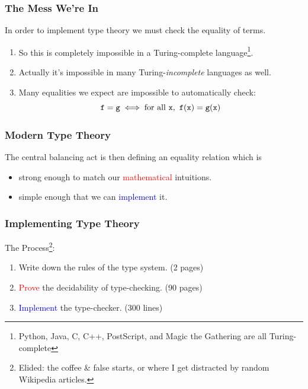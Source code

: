 \documentclass[usenames,dvipsnames,aspectratio=169,12pt]{beamer}
\begin{document}
\begin{frame}
  \frametitle{The Mess We're In}
  In order to implement type theory we must check the equality of terms.
  \begin{enumerate}
  \item So this is completely impossible in a Turing-complete language\footnote{Python, Java, C,
      C++, PostScript, and Magic the Gathering are all Turing-complete}.
  \item Actually it's impossible in many Turing-\emph{incomplete} languages as well.
  \item Many equalities we expect are impossible to automatically check:
    \[
      \mathtt{f} = \mathtt{g} \iff \text{for all } \mathtt{x},\ \mathtt{f}(\mathtt{x}) = \mathtt{g}(\mathtt{x})
    \]
  \end{enumerate}
\end{frame}

\begin{frame}
  \frametitle{Modern Type Theory}
  The central balancing act is then defining an equality relation which is
  \begin{itemize}
  \item strong enough to match our \textcolor{Red}{mathematical} intuitions.
  \item simple enough that we can \textcolor{Blue}{implement} it.
  \end{itemize}
\end{frame}

\begin{frame}
  \frametitle{Implementing Type Theory}
  The Process\footnote{Elided: the coffee \& false starts, or where I get distracted by random Wikipedia articles.}:
  \begin{enumerate}
  \item Write down the rules of the type system. \hfill (2 pages)
  \item \textcolor{Red}{Prove} the decidability of type-checking. \hfill (90 pages)
  \item \textcolor{Blue}{Implement} the type-checker. \hfill (300 lines)
  \end{enumerate}
\end{frame}
\end{document}
